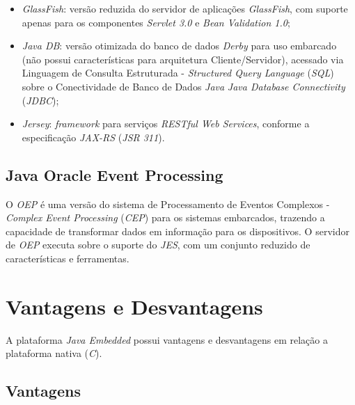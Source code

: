 \begin{itemize}

    \item \textit{GlassFish}: versão reduzida do servidor de aplicações
    \textit{GlassFish}, com suporte apenas para os componentes \textit{Servlet
    3.0} e \textit{Bean Validation 1.0};

    \item \textit{Java DB}: versão otimizada do banco de dados \textit{Derby}
    para uso embarcado (não possui características para arquitetura
    Cliente/Servidor), acessado via Linguagem de Consulta Estruturada -
    \textit{Structured Query Language} (\textit{SQL}) sobre o Conectividade de
    Banco de Dados \textit{Java} \textit{Java Database Connectivity}
    (\textit{JDBC});

    \item \textit{Jersey}: \textit{framework} para serviços \textit{RESTful Web
    Services}, conforme a especificação \textit{JAX-RS} (\textit{JSR 311}).

\end{itemize}

\subsection{Java Oracle Event Processing}

O \textit{OEP} é uma versão do sistema de Processamento de Eventos Complexos -
\textit{Complex Event Processing} (\textit{CEP}) para os sistemas embarcados,
trazendo a capacidade de transformar dados em informação para os dispositivos.
O servidor de \textit{OEP} executa sobre o suporte do \textit{JES}, com um
conjunto reduzido de características e ferramentas.

\section{Vantagens e Desvantagens}

A plataforma \textit{Java Embedded} possui vantagens e desvantagens em relação
a plataforma nativa (\textit{C}).

\newpage
\subsection{Vantagens}


